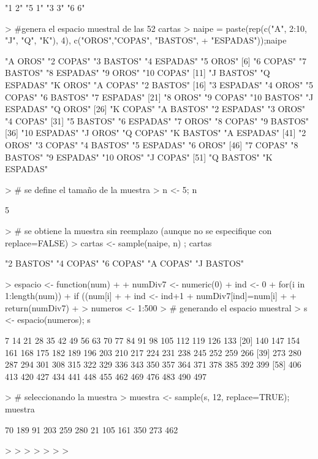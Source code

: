 \documentclass{article}
\begin{document}
\begin{Schunk}
\begin{Soutput}
[1] "1 2" "5 1" "3 3" "6 6"
\end{Soutput}
\begin{Sinput}
> #genera el espacio muestral de las 52 cartas
> naipe = paste(rep(c("A", 2:10, "J", "Q", "K"), 4), c("OROS","COPAS", "BASTOS",
+ "ESPADAS"));naipe
\end{Sinput}
\begin{Soutput}
 [1] "A OROS"     "2 COPAS"    "3 BASTOS"   "4 ESPADAS"  "5 OROS"    
 [6] "6 COPAS"    "7 BASTOS"   "8 ESPADAS"  "9 OROS"     "10 COPAS"  
[11] "J BASTOS"   "Q ESPADAS"  "K OROS"     "A COPAS"    "2 BASTOS"  
[16] "3 ESPADAS"  "4 OROS"     "5 COPAS"    "6 BASTOS"   "7 ESPADAS" 
[21] "8 OROS"     "9 COPAS"    "10 BASTOS"  "J ESPADAS"  "Q OROS"    
[26] "K COPAS"    "A BASTOS"   "2 ESPADAS"  "3 OROS"     "4 COPAS"   
[31] "5 BASTOS"   "6 ESPADAS"  "7 OROS"     "8 COPAS"    "9 BASTOS"  
[36] "10 ESPADAS" "J OROS"     "Q COPAS"    "K BASTOS"   "A ESPADAS" 
[41] "2 OROS"     "3 COPAS"    "4 BASTOS"   "5 ESPADAS"  "6 OROS"    
[46] "7 COPAS"    "8 BASTOS"   "9 ESPADAS"  "10 OROS"    "J COPAS"   
[51] "Q BASTOS"   "K ESPADAS" 
\end{Soutput}
\begin{Sinput}
> # se define el tamaño de la muestra
> n <- 5; n
\end{Sinput}
\begin{Soutput}
[1] 5
\end{Soutput}
\begin{Sinput}
> # se obtiene la muestra sin reemplazo (aunque no se especifique con replace=FALSE)
> cartas <- sample(naipe, n) ; cartas
\end{Sinput}
\begin{Soutput}
[1] "2 BASTOS" "4 COPAS"  "6 COPAS"  "A COPAS"  "J BASTOS"
\end{Soutput}
\begin{Sinput}
> espacio <- function(num)
+ {
+ numDiv7 <- numeric(0)
+ ind <- 0
+ for(i in 1:length(num))
+ if ((num[i] %% 7)==0)
+ {
+ ind <- ind+1
+ numDiv7[ind]=num[i]
+ }
+ return(numDiv7)
+ }
> numeros <- 1:500
> # generando el espacio muestral
> s <- espacio(numeros); s
\end{Sinput}
\begin{Soutput}
 [1]   7  14  21  28  35  42  49  56  63  70  77  84  91  98 105 112 119 126 133
[20] 140 147 154 161 168 175 182 189 196 203 210 217 224 231 238 245 252 259 266
[39] 273 280 287 294 301 308 315 322 329 336 343 350 357 364 371 378 385 392 399
[58] 406 413 420 427 434 441 448 455 462 469 476 483 490 497
\end{Soutput}
\begin{Sinput}
> # seleccionando la muestra
> muestra <- sample(s, 12, replace=TRUE); muestra
\end{Sinput}
\begin{Soutput}
 [1]  70 189  91 203 259 280  21 105 161 350 273 462
\end{Soutput}
\begin{Sinput}
> 
> 
> 
> 
> 
> 
> 
\end{Sinput}
\end{Schunk}
\end{document}
